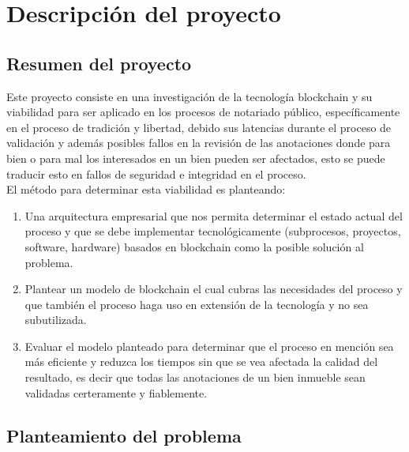 
\chapter{Descripción del proyecto} %

\label{Chapter1} %


\section{Resumen del proyecto}
Este proyecto consiste en una investigación de la tecnología blockchain y su viabilidad para ser aplicado en los procesos de notariado público, específicamente en el proceso de tradición y libertad, debido sus latencias durante el proceso de validación y además posibles fallos en la revisión de las anotaciones donde para bien o para mal los interesados en un bien pueden ser afectados, esto se puede traducir esto en fallos de seguridad e integridad en el proceso. 
\\
El método para determinar esta viabilidad es planteando:   
\begin{enumerate}
\item Una arquitectura empresarial que nos permita determinar el estado actual del proceso y que se debe implementar tecnológicamente (subprocesos, proyectos, software, hardware) basados en blockchain como la posible solución al problema. 
\item Plantear un modelo de blockchain el cual cubras las necesidades del proceso y que también el proceso haga uso en extensión de la tecnología y no sea subutilizada. 
\item Evaluar el modelo planteado para determinar que el proceso en mención sea más eficiente y reduzca los tiempos sin que se vea afectada la calidad del resultado, es decir que todas las anotaciones de un bien inmueble sean validadas certeramente y fiablemente. 
\end{enumerate}

\section{Planteamiento del problema}



